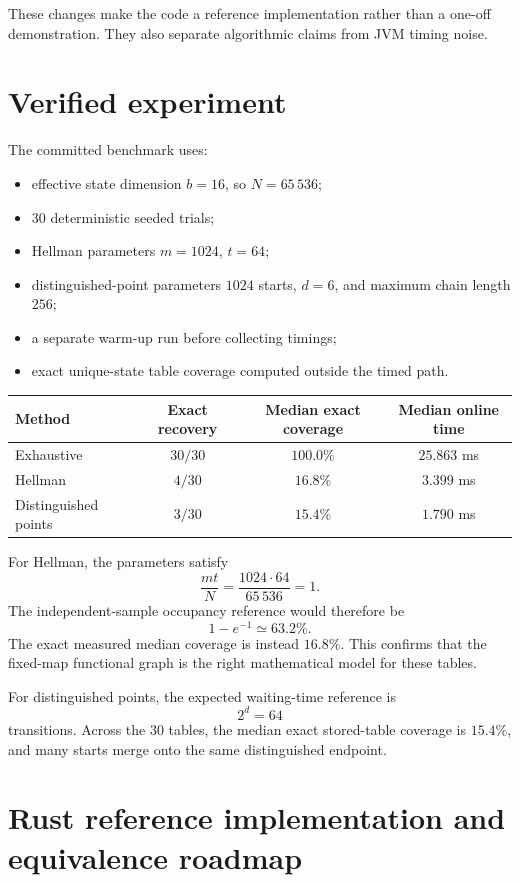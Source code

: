 \documentclass[11pt]{article}
\begin{document}
These changes make the code a reference implementation rather than a
one-off demonstration.  They also separate algorithmic claims from JVM timing
noise.

\section{Verified experiment}

The committed benchmark uses:

\begin{itemize}
  \item effective state dimension $b=16$, so $N=65\,536$;
  \item $30$ deterministic seeded trials;
  \item Hellman parameters $m=1024$, $t=64$;
  \item distinguished-point parameters $1024$ starts, $d=6$, and maximum
        chain length $256$;
  \item a separate warm-up run before collecting timings;
  \item exact unique-state table coverage computed outside the timed path.
\end{itemize}

\begin{center}
\begin{tabular}{lccc}
\toprule
Method & Exact recovery & Median exact coverage & Median online time \\
\midrule
Exhaustive & $30/30$ & $100.0\%$ & $25.863$ ms \\
Hellman & $4/30$ & $16.8\%$ & $3.399$ ms \\
Distinguished points & $3/30$ & $15.4\%$ & $1.790$ ms \\
\bottomrule
\end{tabular}
\end{center}

For Hellman, the parameters satisfy
\[
  \frac{mt}{N}=\frac{1024\cdot 64}{65\,536}=1.
\]
The independent-sample occupancy reference would therefore be
\[
  1-e^{-1}\simeq 63.2\%.
\]
The exact measured median coverage is instead $16.8\%$.  This confirms that
the fixed-map functional graph is the right mathematical model for these
tables.

For distinguished points, the expected waiting-time reference is
\[
  2^d=64
\]
transitions.  Across the $30$ tables, the median exact stored-table coverage
is $15.4\%$, and many starts merge onto the same distinguished endpoint.

\section{Rust reference implementation and equivalence roadmap}
\end{document}
